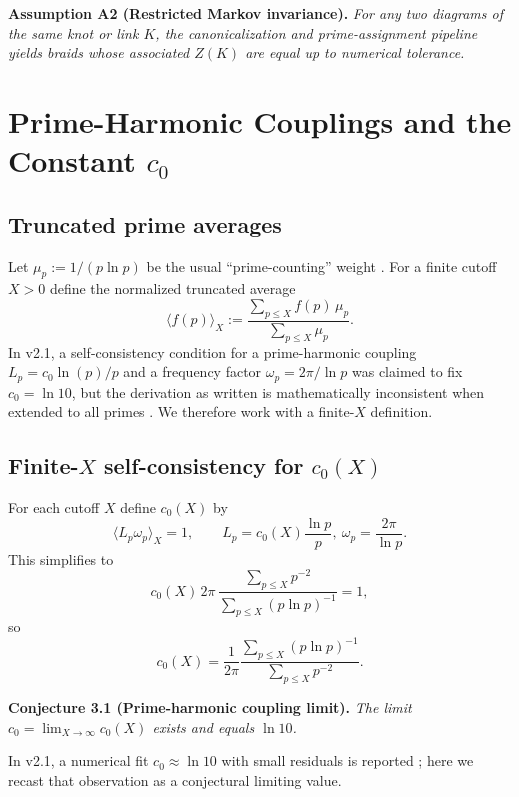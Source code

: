 \documentclass[11pt]{article}
\begin{document}
\medskip

\noindent\textbf{Assumption A2 (Restricted Markov invariance).}
\emph{For any two diagrams of the same knot or link $K$, the canonicalization and prime-assignment pipeline yields braids whose associated $Z(K)$ are equal up to numerical tolerance.}

\section{Prime-Harmonic Couplings and the Constant $c_0$}

\subsection{Truncated prime averages}

Let $\mu_p := 1/(p \ln p)$ be the usual ``prime-counting'' weight \cite[Sec.~1]{MTv21}. For a finite cutoff $X>0$ define the normalized truncated average
\[
  \langle f(p) \rangle_X := \frac{\sum_{p\le X} f(p)\,\mu_p}{\sum_{p\le X} \mu_p}.
\]
In v2.1, a self-consistency condition for a prime-harmonic coupling $L_p = c_0 \ln(p)/p$ and a frequency factor $\omega_p = 2\pi/\ln p$ was claimed to fix $c_0 = \ln 10$, but the derivation as written is mathematically inconsistent when extended to all primes \cite[Sec.~3.3]{MTv21}. We therefore work with a finite-$X$ definition.

\subsection{Finite-$X$ self-consistency for $c_0(X)$}

For each cutoff $X$ define $c_0(X)$ by
\begin{equation}
  \big\langle L_p \omega_p \big\rangle_X = 1, \qquad
  L_p = c_0(X) \frac{\ln p}{p},\ \omega_p = \frac{2\pi}{\ln p}.
\end{equation}
This simplifies to
\[
  c_0(X)\, 2\pi \, \frac{\sum_{p\le X} p^{-2}}{\sum_{p\le X} (p\ln p)^{-1}} = 1,
\]
so
\begin{equation}
  c_0(X) = \frac{1}{2\pi} \frac{\sum_{p\le X} (p\ln p)^{-1}}{\sum_{p\le X} p^{-2}}.
  \label{eq:c0X}
\end{equation}

\medskip

\noindent\textbf{Conjecture 3.1 (Prime-harmonic coupling limit).}
\emph{The limit $c_0 = \lim_{X\to\infty} c_0(X)$ exists and equals $\ln 10$.}

In v2.1, a numerical fit $c_0 \approx \ln 10$ with small residuals is reported \cite[Sec.~3.3]{MTv21}; here we recast that observation as a conjectural limiting value.
\end{document}
